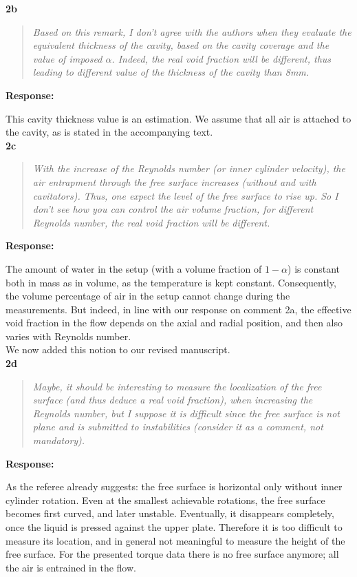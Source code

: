 \documentclass[10pt]{article}
\newcommand{\strong}[1]{\textbf{#1}}
\newcommand{\question}[1]{\begin{quote} \emph{#1}  \end{quote} }
\begin{document}
\noindent \strong{2b}

\question{Based on this remark, I don't agree with the authors when they evaluate the equivalent thickness of the cavity, based on the cavity coverage and the value of imposed $\alpha$. Indeed, the real void fraction will be different, thus leading to different value of the thickness of the cavity than 8mm.
 }

\noindent \strong{Response:} 

\noindent This cavity thickness value is an estimation. We assume that all air is attached to the cavity, as is stated in the accompanying text. \\

\noindent \strong{2c}

\question{With the increase of the Reynolds number (or inner cylinder velocity), the air entrapment through the free surface increases (without and with cavitators). Thus, one expect the level of the free surface to rise up. So I don't see how you can control the air volume fraction, for different Reynolds number, the real void fraction will be different.
 }

\noindent \strong{Response:} 

\noindent The amount of water in the setup (with a volume fraction of $1-\alpha$) is constant both in mass as in volume, as the temperature is kept constant. Consequently, the volume percentage of air in the setup cannot change during the measurements. But indeed, in line with our response on comment 2a, the effective void fraction in the flow depends on the axial and radial position, and then also varies with Reynolds number. \\
We now added this notion to our revised manuscript. \\

\noindent \strong{2d}

\question{Maybe, it should be interesting to measure the localization of the free surface (and thus deduce a real void fraction), when increasing the Reynolds number, but I suppose it is difficult since the free surface is not plane and is submitted to instabilities (consider it as a comment, not mandatory).
 }

\noindent \strong{Response:} 

\noindent As the referee already suggests: the free surface is horizontal only without inner cylinder rotation. Even at the smallest achievable rotations, the free surface becomes first curved, and later unstable. Eventually, it disappears completely, once the liquid is pressed against the upper plate. Therefore it is too difficult to measure its location, and in general not meaningful to measure the height of the free surface. For the presented torque data there is no free surface anymore; all the air is entrained in the flow.\\
\end{document}
